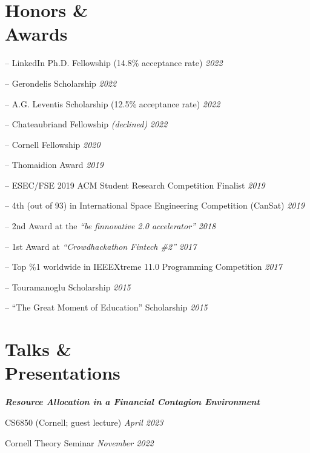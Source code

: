 \documentclass[margin]{res}
\newcommand{\bemph}[1]{\textbf{\emph{#1}}}
\begin{document}
\begin{resume}
\section{Honors \& \\ Awards} 
\begin{compactitem}
	\item[--] LinkedIn Ph.D. Fellowship (14.8\% acceptance rate) \hfill \emph{2022} 	
	\item[--] Gerondelis Scholarship \hfill \emph{2022}
	\item[--] A.G. Leventis Scholarship (12.5\% acceptance rate) \hfill \emph{2022}
	\item[--] Chateaubriand Fellowship \emph{(declined)} \hfill \emph{2022}
	\item[--] Cornell Fellowship \hfill \emph{2020}
	\item[--] Thomaidion Award \hfill \emph{2019}
	\item[--] ESEC/FSE 2019 ACM Student Research Competition Finalist \hfill \emph{2019}

	\item[--] 4th (out of 93) in International Space Engineering  Competition (CanSat) \hfill \emph{2019}
    \item[--] 2nd Award at the \emph{``be finnovative 2.0 accelerator''} \hfill \emph{2018}
   	\item[--] 1st Award at \emph{``Crowdhackathon Fintech \#2''} \hfill \emph{2017}
   	\item[--] Top \%1 worldwide in IEEEXtreme 11.0 Programming Competition \hfill \emph{2017}
    \item [--] Touramanoglu Scholarship \hfill \emph{2015}
    \item [--] ``The Great Moment of Education'' Scholarship \hfill \emph{2015}

\end{compactitem}

\section{Talks \& \\ Presentations}

\begin{compactitem}
	\item \bemph{Resource Allocation in a Financial Contagion Environment}
	\begin{compactitem}
		\item CS6850 (Cornell; guest lecture) \hfill \emph{April 2023}
		\item Cornell Theory Seminar \hfill \emph{November 2022}
	\end{compactitem}
	

\end{compactitem}
\end{resume}
\end{document}
